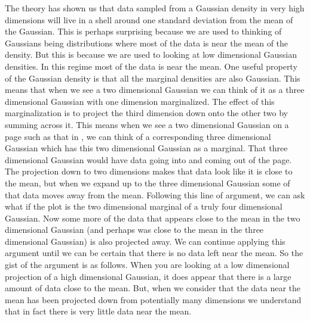 The theory has shown us that data sampled from a Gaussian density in
very high dimensions will live in a shell around one standard
deviation from the mean of the Gaussian. This is perhaps surprising
because we are used to thinking of Gaussians being distributions where
most of the data is near the mean of the density. But this is because
we are used to looking at low dimensional Gaussian densities. In this
regime most of the data is near the mean. One useful property of the
Gaussian density is that all the marginal densities are also
Gaussian. This means that when we see a two dimensional Gaussian we
can think of it as a three dimensional Gaussian with one dimension
marginalized. The effect of this marginalization is to project the
third dimension down onto the other two by summing across it. This
means when we see a two dimensional Gaussian on a page such as that in
, we can think of a corresponding three
dimensional Gaussian which has this two dimensional Gaussian as a
marginal. That three dimensional Gaussian would have data going into
and coming out of the page. The projection down to two dimensions
makes that data look like it is close to the mean, but when we expand
up to the three dimensional Gaussian some of that data moves away from
the mean. Following this line of argument, we can ask what if the plot
is the two dimensional marginal of a truly four dimensional
Gaussian. Now some more of the data that appears close to the mean in
the two dimensional Gaussian (and perhaps was close to the mean in the
three dimensional Gaussian) is also projected away. We can continue
applying this argument until we can be certain that there is no data
left near the mean. So the gist of the argument is as follows. When
you are looking at a low dimensional projection of a high dimensional
Gaussian, it does appear that there is a large amount of data close to
the mean. But, when we consider that the data near the mean has been
projected down from potentially many dimensions we understand that in
fact there is very little data near the mean.
% 
